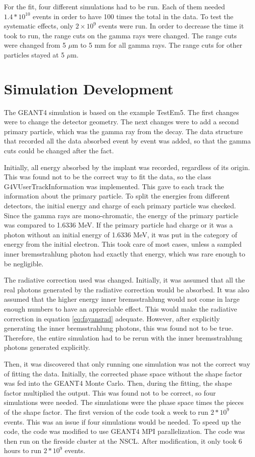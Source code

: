\documentclass[../MaxHughesThesis.tex]{subfiles}
\begin{document}
For the fit, four different simulations had to be run.
Each of them needed $1.4 * 10^{10}$ events in order to have 100 times the total in the data.
To test the systematic effects, only $2 \times 10^{9}$ events were run.
In order to decrease the time it took to run, the range cuts on the gamma rays were changed.
The range cuts were changed from 5 $\mu$m to 5 mm for all gamma rays.
The range cuts for other particles stayed at 5 $\mu$m.

\section{Simulation Development}
The GEANT4 simulation is based on the example TestEm5.
The first changes were to change the detector geometry. 
The next changes were to add a second primary particle, which was the gamma ray from the decay.
The data structure that recorded all the data absorbed event by event was added, so that the gamma cuts could be changed after the fact.

Initially, all energy absorbed by the implant was recorded, regardless of its origin.
This was found not to be the correct way to fit the data, so the class G4VUserTrackInformation was implemented.
This gave to each track the information about the primary particle.
To split the energies from different detectors, the initial energy and charge of each primary particle was checked.
Since the gamma rays are mono-chromatic, the energy of the primary particle was compared to 1.6336 MeV.
If the primary particle had charge or it was a photon without an initial energy of 1.6336 MeV, it was put in the category of energy from the initial electron. 
This took care of most cases, unless a sampled inner bremsstrahlung photon had exactly that energy, which was rare enough to be negligible.

The radiative correction used was changed.
Initially, it was assumed that all the real photons generated by the radiative correction would be absorbed.
It was also assumed that the higher energy inner bremsstrahlung would not come in large enough numbers to have an appreciable effect. 
This would make the radiative correction in equation \ref{eq:fayansrad} adequate. 
However, after explicitly generating the inner bremsstrahlung photons, this was found not to be true.
Therefore, the entire simulation had to be rerun with the inner bremsstrahlung photons generated explicitly.

Then, it was discovered that only running one simulation was not the correct way of fitting the data.
Initially, the corrected phase space without the shape factor was fed into the GEANT4 Monte Carlo.
Then, during the fitting, the shape factor multiplied the output. 
This was found not to be correct, so four simulations were needed.
The simulations were the phase space times the pieces of the shape factor.
The first version of the code took a week to run $2 * 10^{9}$ events.
This was an issue if four simulations would be needed.
To speed up the code, the code was modified to use GEANT4 MPI parallelization.
The code was then run on the fireside cluster at the NSCL.
After modification, it only took 6 hours to run $2 * 10^{9}$ events.
\end{document}
